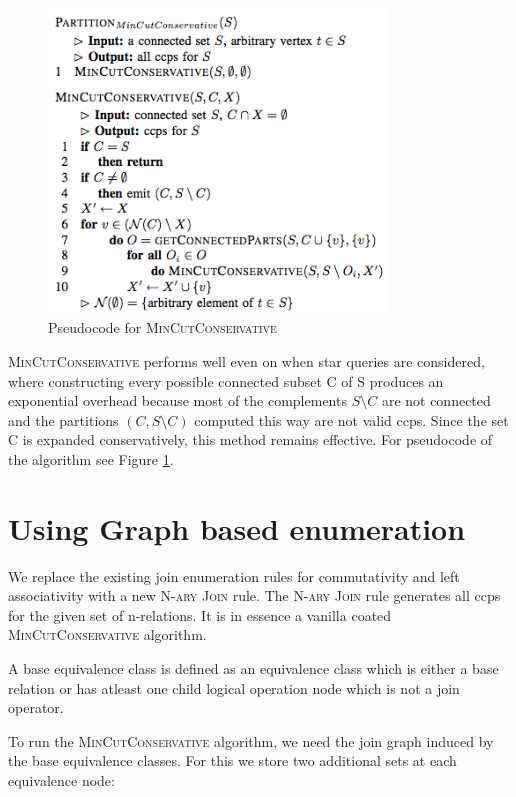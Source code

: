\begin{figure}[here]
\begin{center}
\includegraphics[width=9cm]{Figures/mincutconservative.png}
\end{center}
\caption{Pseudocode for \textsc{MinCutConservative}}
\label{fig:mincutconservative}
\end{figure}

\textsc{MinCutConservative} performs well even on when star queries are considered, where constructing every possible connected subset C of S produces an exponential overhead because most of the complements $S \setminus C$ are not connected and the partitions $(C, S \setminus C)$ computed this way are not valid ccps. Since the set C is expanded conservatively, this method remains effective. For pseudocode of the algorithm see Figure \ref{fig:mincutconservative}.

\section{Using Graph based enumeration}
We replace the existing join enumeration rules for commutativity and left associativity with a new  \textsc{N-ary Join} rule. The \textsc{N-ary Join} rule generates all ccps for the given set of n-relations. It is in essence a vanilla coated \textsc{MinCutConservative} algorithm.

\begin{defn}
A base equivalence class is defined as an equivalence class which is either a base relation or has atleast one  child logical operation node which is not a join operator.
\end{defn}

To run the \textsc{MinCutConservative} algorithm, we need the join graph induced by the base equivalence classes. For this we store two additional sets at each equivalence node:

